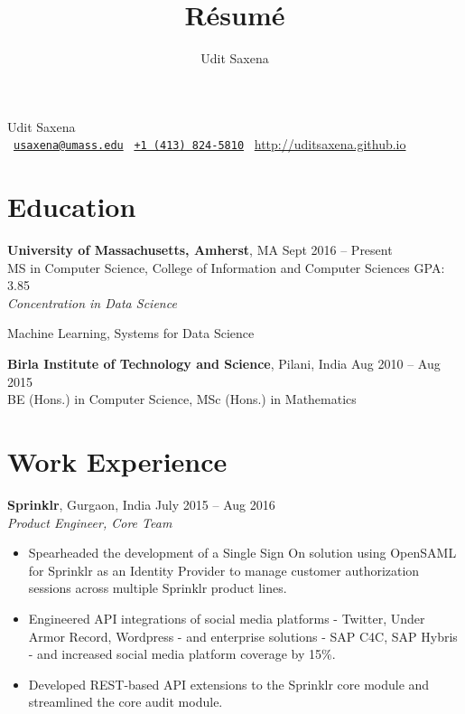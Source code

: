 \documentclass[letterpaper]{article}
\title{R\'esum\'e}
\author{Udit Saxena}
\begin{document}
\pagecolor{white}
\begin{center}
\huge
Udit Saxena\\
\small
\faEnvelope~\href{mailto:usaxena@umass.edu}{\nolinkurl{usaxena@umass.edu}}
\faPhone~\href{tel:14138245810}{\texttt{+1 (413) 824-5810}}
\faGlobe~\url{http://uditsaxena.github.io}
\normalsize
\end{center}

\section*{Education}
\vspace{-1mm}
\textbf{University of Massachusetts, Amherst}, MA \hfill Sept 2016 --
    Present\\
MS in Computer Science, College of Information and Computer Sciences \hfill GPA: 3.85
\\\emph{Concentration in Data Science}
\vspace{-2mm}
\begin{description}[leftmargin=!, labelwidth=\widthof{Coursework },
        font=\normalfont]
    \item[Coursework:] Machine Learning,
                        Systems for Data Science
\end{description}
\vspace{-0.5mm}
\textbf{Birla Institute of Technology and Science}, Pilani, India \hfill
    Aug 2010 -- Aug 2015\\
BE (Hons.) in Computer Science,
MSc (Hons.) in Mathematics

\section*{Work Experience}
\textbf{Sprinklr}, Gurgaon, India \hfill July 2015 -- Aug 2016\\
\emph{Product Engineer, Core Team}\\
\vspace{-6mm}
\begin{itemize}
\item Spearheaded the development of a Single Sign On solution using OpenSAML for Sprinklr as an Identity Provider to manage customer authorization sessions across multiple Sprinklr product lines.
\vspace{-2mm}
\item Engineered API integrations of  social media platforms - Twitter, Under Armor Record, Wordpress - and enterprise solutions - SAP C4C, SAP Hybris - and increased social media platform coverage by 15\%. 
\vspace{-2mm}
\item Developed REST-based API extensions to the Sprinklr core module and streamlined the core audit module.
\end{itemize}
\end{document}
